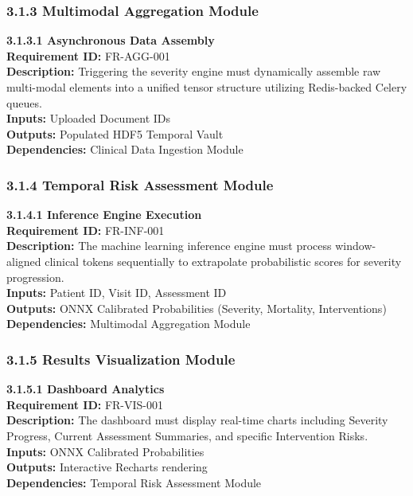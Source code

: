 \documentclass{fisatprojectfinal}
\begin{document}
\subsubsection{3.1.3 Multimodal Aggregation Module}
\textbf{3.1.3.1 Asynchronous Data Assembly} \\
\textbf{Requirement ID:} FR-AGG-001 \\
\textbf{Description:} Triggering the severity engine must dynamically assemble raw multi-modal elements into a unified tensor structure utilizing Redis-backed Celery queues. \\
\textbf{Inputs:} Uploaded Document IDs \\
\textbf{Outputs:} Populated HDF5 Temporal Vault \\
\textbf{Dependencies:} Clinical Data Ingestion Module

\subsubsection{3.1.4 Temporal Risk Assessment Module}
\textbf{3.1.4.1 Inference Engine Execution} \\
\textbf{Requirement ID:} FR-INF-001 \\
\textbf{Description:} The machine learning inference engine must process window-aligned clinical tokens sequentially to extrapolate probabilistic scores for severity progression. \\
\textbf{Inputs:} Patient ID, Visit ID, Assessment ID \\
\textbf{Outputs:} ONNX Calibrated Probabilities (Severity, Mortality, Interventions) \\
\textbf{Dependencies:} Multimodal Aggregation Module

\subsubsection{3.1.5 Results Visualization Module}
\textbf{3.1.5.1 Dashboard Analytics} \\
\textbf{Requirement ID:} FR-VIS-001 \\
\textbf{Description:} The dashboard must display real-time charts including Severity Progress, Current Assessment Summaries, and specific Intervention Risks. \\
\textbf{Inputs:} ONNX Calibrated Probabilities \\
\textbf{Outputs:} Interactive Recharts rendering \\
\textbf{Dependencies:} Temporal Risk Assessment Module
\end{document}

